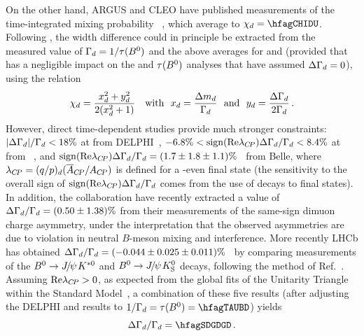On the other hand, ARGUS and CLEO have published 
measurements of the time-integrated mixing probability 
\chid~\cite{Albrecht:1992yd,*Albrecht:1993gr_cont,Bartelt:1993cf,Behrens:2000qu}, 
which average to $\chid =\hfagCHIDU$.
Following , 
the width difference \DGd could 
in principle be extracted from the
measured value of $\Gamma_{d}=1/\tau(B^0)$ and the above averages for 
\dmd and \chid 
(provided that \DGd has a negligible impact on 
the \dmd and $\tau(B^0)$ analyses that have assumed $\Delta\Gamma_{d}=0$), 
using the relation
\begin{equation}
\chid = \frac{\xd^2+\yd^2}{2(\xd^2+1)} ~~~ \mbox{with} ~~ \xd=\frac{\dmd}{\Gd} 
~~ \mbox{and} ~~ \yd=\frac{\DGd}{2\Gd} \,.
\labe{chid_definition}
\end{equation}
However, direct time-dependent studies provide much stronger constraints: 
$|\Delta\Gamma_{d}|/\Gamma_{d} < 18\%$ at  from DELPHI~\cite{Abdallah:2002mr},
$-6.8\% < {\rm sign}({\rm Re} \lambda_{C\!P}) \Delta\Gamma_{d}/\Gamma_{d} < 8.4\%$
at  from \babar~\cite{Aubert:2003hd,*Aubert:2004xga_mod_cont},
and ${\rm sign}({\rm Re} \lambda_{C\!P})\Delta\Gamma_{d}/\Gamma_{d} = (1.7 \pm 1.8 \pm 1.1)\%$~\cite{Higuchi:2012kx}
from Belle, 
where $\lambda_{\CP} = (q/p)_{\particle{d}} (\bar{A}_{\CP}/A_{\CP})$
is defined for a \CP-even final state 
(the sensitivity to the overall sign of 
${\rm sign}({\rm Re} \lambda_{C\!P}) \Delta\Gamma_{d}/\Gamma_{d}$ comes
from the use of \Bd decays to \CP final states).
In addition, the \dzero collaboration have recently extracted a value of 
$\Delta\Gamma_{d}/\Gamma_{d}=(0.50 \pm 1.38)\%$\cite{Abazov:2013uma,*Abazov:2011yk_mod,*Abazov:2010hv_mod_cont,*Abazov:2010hj_mod_cont,*Abazov:2011yk_cont}
from their measurements of the same-sign dimuon charge asymmetry, 
under the interpretation that 
the observed asymmetries are due to \CP violation in neutral $B$-meson mixing and interference.
More recently LHCb has obtained $\Delta\Gamma_{d}/\Gamma_{d}=(-0.044 \pm 0.025 \pm 0.011)\%$~\cite{Aaij:2014owa}
by comparing measurements of the $B^0 \to {J\mskip -3mu/\mskip -2mu\psi\mskip 2mu} K^{*0}$ and $B^0 \to {J\mskip -3mu/\mskip -2mu\psi\mskip 2mu} K^0_{\rm S}$
decays, following the method of Ref.~\cite{Gershon:2010wx}.
Assuming ${\rm Re} \lambda_{C\!P} > 0$, as expected from the global fits
of the Unitarity Triangle within the Standard Model~\cite{Charles:2011va_mod,*Bona:2006ah},
a combination of these five results (after adjusting the DELPHI and \babar results to  
$1/\Gd=\tau(\Bd)=\hfagTAUBD$) yields
\begin{equation}
\DGGd  = \hfagSDGDGD \,.
\end{equation}

